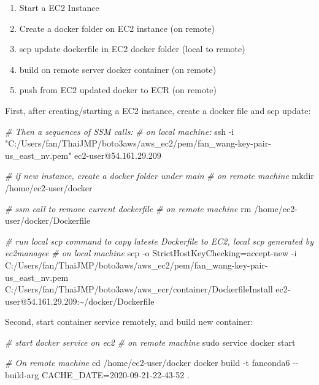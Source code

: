 \documentclass[
]{book}
\newenvironment{Shaded}{\begin{snugshade}}{\end{snugshade}}
\newcommand{\BuiltInTok}[1]{#1}
\newcommand{\CommentTok}[1]{\textcolor[rgb]{0.56,0.35,0.01}{\textit{#1}}}
\newcommand{\ExtensionTok}[1]{#1}
\newcommand{\FunctionTok}[1]{\textcolor[rgb]{0.00,0.00,0.00}{#1}}
\newcommand{\NormalTok}[1]{#1}
\newcommand{\StringTok}[1]{\textcolor[rgb]{0.31,0.60,0.02}{#1}}
\providecommand{\tightlist}{%
  \setlength{\itemsep}{0pt}\setlength{\parskip}{0pt}}
\begin{document}
\begin{enumerate}
\def\labelenumi{\arabic{enumi}.}
\tightlist
\item
  Start a EC2 Instance
\item
  Create a docker folder on EC2 instance (on remote)
\item
  scp update dockerfile in EC2 docker folder (local to remote)
\item
  build on remote server docker container (on remote)
\item
  push from EC2 updated docker to ECR (on remote)
\end{enumerate}

First, after creating/starting a EC2 instance, create a docker file and scp update:

\begin{Shaded}
\begin{Highlighting}[]
\CommentTok{\# Then a sequences of SSM calls:}
\CommentTok{\# on local machine:}
\FunctionTok{ssh}\NormalTok{ {-}i }\StringTok{"C:/Users/fan/ThaiJMP/boto3aws/aws\_ec2/pem/fan\_wang{-}key{-}pair{-}us\_east\_nv.pem"}\NormalTok{ ec2{-}user@54.161.29.209}

\CommentTok{\# if new instance, create a docker folder under main}
\CommentTok{\# on remote machine}
\FunctionTok{mkdir}\NormalTok{ /home/ec2{-}user/docker}

\CommentTok{\# ssm call to remove current dockerfile}
\CommentTok{\# on remote machine}
\FunctionTok{rm}\NormalTok{ /home/ec2{-}user/docker/Dockerfile}

\CommentTok{\# run local scp command to copy lateste Dockerfile to EC2, local scp generated by ec2managee}
\CommentTok{\# on local machine}
\FunctionTok{scp}\NormalTok{ {-}o StrictHostKeyChecking=accept{-}new {-}i C:/Users/fan/ThaiJMP/boto3aws/aws\_ec2/pem/fan\_wang{-}key{-}pair{-}us\_east\_nv.pem C:/Users/fan/ThaiJMP/boto3aws/aws\_ecr/container/DockerfileInstall ec2{-}user@54.161.29.209:\textasciitilde{}/docker/Dockerfile}
\end{Highlighting}
\end{Shaded}

Second, start container service remotely, and build new container:

\begin{Shaded}
\begin{Highlighting}[]
\CommentTok{\# start docker service on ec2}
\CommentTok{\# on remote machine}
\FunctionTok{sudo}\NormalTok{ service docker start}

\CommentTok{\# On remote machine}
\BuiltInTok{cd}\NormalTok{ /home/ec2{-}user/docker}
\ExtensionTok{docker}\NormalTok{ build {-}t fanconda6 {-}{-}build{-}arg CACHE\_DATE=2020{-}09{-}21{-}22{-}43{-}52 .}
\end{Highlighting}
\end{Shaded}
\end{document}
